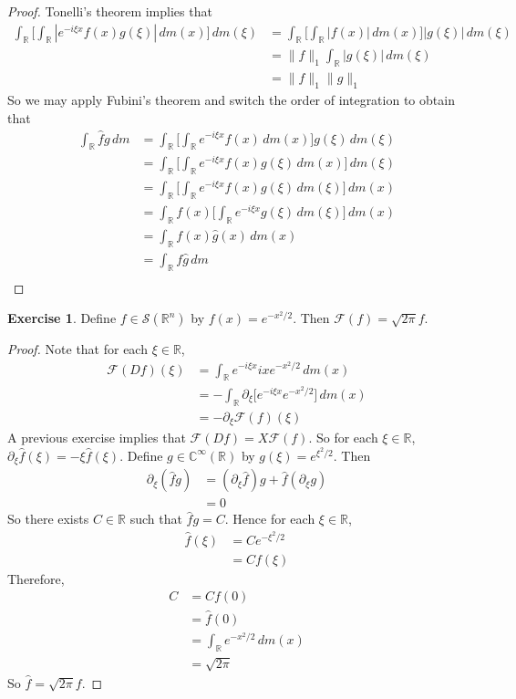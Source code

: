 \documentclass{book}
\theoremstyle{definition}
\newtheorem{ex}[definition]{Exercise}
\newcommand{\C}{\mathbb{C}}
\newcommand{\R}{\mathbb{R}}
\newcommand{\MF}{\mathcal{F}}
\newcommand{\MS}{\mathcal{S}}
\DeclareMathOperator*{\0}{\mbf{0}}
\DeclareMathOperator*{\1}{\mbf{1}}
\newcommand{\p}{\partial}
\newcommand{\dm}{\, d m}
\begin{document}
	\begin{proof}
		Tonelli's theorem implies that  
		\begin{align*}
			\int_{\R} \bigg[ \int_{\R}|e^{-i \xi x} f(x) g(\xi)| \dm(x) \bigg] \dm(\xi)
			& = \int_{\R} \bigg[ \int_{\R}|f(x)| \dm(x) \bigg]  |g(\xi)| \dm(\xi) \\
			& = \|f\|_1 \int_{\R}  |g(\xi)| \dm(\xi) \\
			& = \|f\|_1\|g\|_1
		\end{align*}  
		So we may apply Fubini's theorem and switch the order of integration to obtain that
		\begin{align*}
			\int_{\R}\hat{f} g \dm 
			& = \int_{\R} \bigg[ \int_{\R}e^{-i \xi x} f(x) \dm(x) \bigg]  g(\xi) \dm(\xi) \\
			& = \int_{\R} \bigg[ \int_{\R}e^{-i \xi x} f(x) g(\xi) \dm(x) \bigg] \dm(\xi) \\
			& = \int_{\R} \bigg[ \int_{\R}e^{-i \xi x} f(x) g(\xi) \dm(\xi) \bigg] \dm(x) \\
			& = \int_{\R} f(x) \bigg[ \int_{\R}e^{-i \xi x}  g(\xi) \dm(\xi) \bigg] \dm(x) \\
			& = \int_{\R} f(x) \hat{g}(x) \dm(x) \\
			& = \int_{\R} f \hat{g} \dm \\
		\end{align*}
	\end{proof}


	\begin{ex}
		Define $f \in \MS(\R^n)$ by $f(x) = e^{-x^2/2}$. Then $\MF(f) = \sqrt{2 \pi}f$.
	\end{ex}

	\begin{proof}
		Note that for each $\xi \in \R$, 
		\begin{align*}
			\MF(Df)(\xi) 
			& = \int_{\R} e^{-i \xi x}ixe^{-x^2/2} \dm(x) \\
			& = -\int_{\R}  \p_{\xi} \bigg[ e^{-i \xi x} e^{-x^2/2}\bigg] \dm(x) \\
			& = - \p_{\xi} \MF(f)(\xi) 
		\end{align*}
		A previous exercise implies that $\MF(Df) = X \MF(f)$. So for each $\xi \in \R$, $\p_{\xi} \hat{f}(\xi) = - \xi \hat{f}(\xi)$. Define $g \in \C^{\infty}(\R)$ by $g(\xi) = e^{\xi^2/2}$. Then 
		\begin{align*}
			\p_{\xi} (\hat{f} g) 
			& = (\p_{\xi} \hat{f}) g + \hat{f} (\p_{\xi}g) \\
			& = 0
		\end{align*}
		So there exists $C \in \R$ such that $\hat{f}g = C$. Hence for each $\xi \in \R$, 
		\begin{align*}
			\hat{f}(\xi) 
			& = Ce^{-\xi^2/2} \\
			& = Cf(\xi)
		\end{align*}
		Therefore, 
		\begin{align*}
			C
			& = Cf(0) \\
			& = \hat{f}(0) \\
			& = \int_{\R} e^{-x^2/2} \dm(x) \\
			& = \sqrt{2 \pi} 
		\end{align*}
		So $\hat{f} = \sqrt{2 \pi}f$.
	\end{proof}
\end{document}
